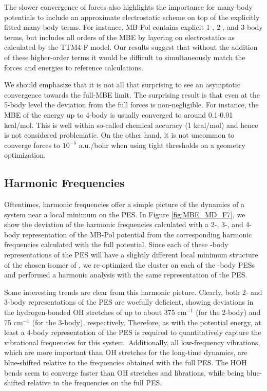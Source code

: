 \documentclass[11pt, proquest]{uwthesis}[2020/02/24]
\let\ce\ch
\begin{document}
\par The slower convergence of forces also highlights the importance for many-body potentials to include an approximate electrostatic scheme on top of the explicitly fitted many-body terms. For instance, MB-Pol contains explicit 1-, 2-, and 3-body terms, but includes all orders of the MBE by layering on electrostatics as calculated by the TTM4-F model.\autocite{burnham_vibrational_2008} Our results suggest that without the addition of these higher-order terms it would be difficult to simultaneously match the forces and energies to reference calculations.

\par We should emphasize that it is not all that surprising to see an asymptotic convergence towards the full-MBE limit. The surprising result is that even at the 5-body level the deviation from the full forces is non-negligible. For instance, the MBE of the energy up to 4-body is usually converged to around 0.1-0.01 kcal/mol. This is well within so-called chemical accuracy (1 kcal/mol) and hence is not considered problematic. On the other hand, it is not uncommon to converge forces to $10^{-5}$ a.u./bohr when using tight thresholds on a geometry optimization. 

\subsection{Harmonic Frequencies}

\par Oftentimes, harmonic frequencies offer a simple picture of the dynamics of a system near a local minimum on the PES. In Figure \ref{fig:MBE_MD_F7}, we show the deviation of the harmonic frequencies calculated with a 2-, 3-, and 4-body representation of the MB-Pol potential from the corresponding harmonic frequencies calculated with the full potential. Since each of these -body representations of the PES will have a slightly different local minimum structure of the chosen isomer of \ce{(H2O)_{10}}, we re-optimized the cluster on each of the -body PESs and performed a harmonic analysis with the same representation of the PES.

\par Some interesting trends are clear from this harmonic picture. Clearly, both 2- and 3-body representations of the PES are woefully deficient, showing deviations in the hydrogen-bonded OH stretches of up to about 375 $\mathrm{cm}^{-1}$ (for the 2-body) and 75 $\mathrm{cm}^{-1}$ (for the 3-body), respectively. Therefore, as with the potential energy, at least a 4-body representation of the PES is required to quantitatively capture the vibrational frequencies for this system. Additionally, all low-frequency vibrations, which are more important than OH stretches for the long-time dynamics, are blue-shifted relative to the frequencies obtained with the full PES. The HOH bends seem to converge faster than OH stretches and librations, while being blue-shifted relative to the frequencies on the full PES.
\end{document}
